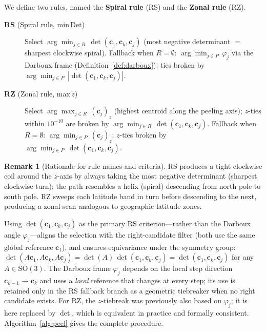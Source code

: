 \documentclass[12pt]{article}
\theoremstyle{definition}
\newtheorem{remark}{Remark}[section]
\begin{document}
We define two rules, named the \textbf{Spiral rule} (RS) and the
\textbf{Zonal rule} (RZ).

\begin{description}
  \item[\textbf{RS} (Spiral rule, min\,Det)]
    Select
    $\displaystyle\arg\min_{j\in R}\,\det(\mathbf{c}_1,\mathbf{c}_k,\mathbf{c}_j)$
    (most negative determinant $=$ sharpest clockwise spiral).
    Fallback when $R=\emptyset$:
    $\arg\min_{j\in P}\,\varphi_j$ via the Darboux frame
    (Definition~\ref{def:darboux});
    ties broken by $\arg\min_{j\in P}\,|\det(\mathbf{c}_1,\mathbf{c}_k,\mathbf{c}_j)|$.

  \item[\textbf{RZ} (Zonal rule, max\,$z$)]
    Select $\displaystyle\arg\max_{j\in R}\,(\mathbf{c}_j)_z$
    (highest centroid along the peeling axis);
    $z$-ties within $10^{-10}$ are broken by
    $\arg\min_{j\in R}\,\det(\mathbf{c}_1,\mathbf{c}_k,\mathbf{c}_j)$.
    Fallback when $R=\emptyset$:
    $\arg\min_{j\in P}\,(\mathbf{c}_j)_z$;
    $z$-ties broken by
    $\arg\min_{j\in P}\,\det(\mathbf{c}_1,\mathbf{c}_k,\mathbf{c}_j)$.
\end{description}

\begin{remark}[Rationale for rule names and criteria]
RS produces a tight clockwise coil around the $z$-axis by always taking the
most negative determinant (sharpest clockwise turn);
the path resembles a helix (spiral) descending from north pole to south pole.
RZ sweeps each latitude band in turn before descending to the next,
producing a zonal scan analogous to geographic latitude zones.

Using $\det(\mathbf{c}_1,\mathbf{c}_k,\mathbf{c}_j)$ as the primary RS
criterion---rather than the Darboux angle $\varphi_j$---aligns the selection
with the right-candidate filter (both use the same global reference $\mathbf{c}_1$),
and ensures equivariance under the symmetry group:
$\det(A\mathbf{c}_1,A\mathbf{c}_k,A\mathbf{c}_j)=\det(A)\,\det(\mathbf{c}_1,\mathbf{c}_k,\mathbf{c}_j)=\det(\mathbf{c}_1,\mathbf{c}_k,\mathbf{c}_j)$
for any $A\in\mathrm{SO}(3)$.
The Darboux frame $\varphi_j$ depends on the local step direction
$\mathbf{c}_{k-1}\to\mathbf{c}_k$ and uses a \emph{local} reference that
changes at every step; its use is retained only in the RS fallback branch
as a geometric tiebreaker when no right candidate exists.
For RZ, the $z$-tiebreak was previously also based on $\varphi_j$; it is
here replaced by $\det$, which is equivalent in practice and
formally consistent.
Algorithm~\ref{alg:peel} gives the complete procedure.
\end{remark}
\end{document}
